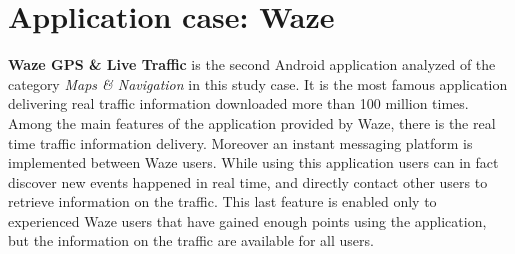 \newpage
\section{Application case: Waze}
	\par \textbf{Waze GPS \& Live Traffic} is the second Android application analyzed of the category \textit{Maps \& Navigation} in this study case. It is the most famous application delivering real traffic information downloaded more than 100 million times. Among the main features of the application provided by Waze, there is the real time traffic information delivery. Moreover an instant messaging platform is implemented between Waze users. While using this application users can in fact discover new events happened in real time, and directly contact other users to retrieve information on the traffic. This last feature is enabled only to experienced Waze users that have gained enough points using the application, but the information on the traffic are available for all users. 
	
